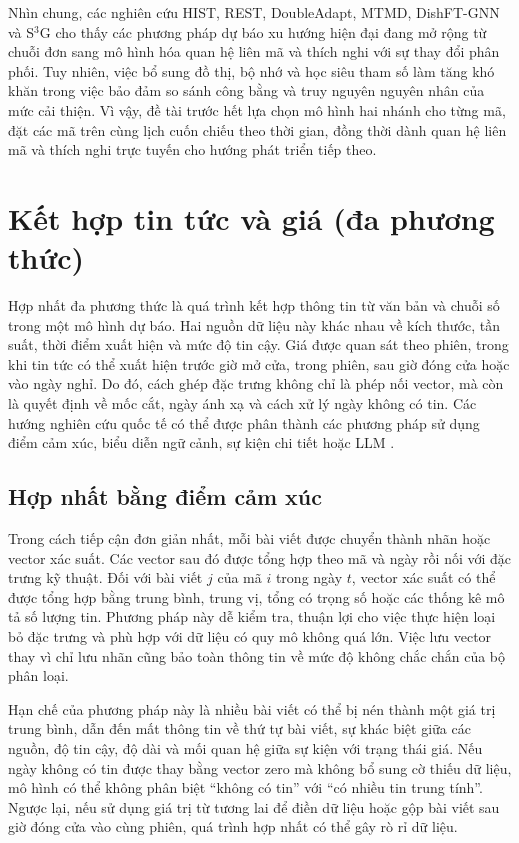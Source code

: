\documentclass[12pt, a4paper, oneside]{report}
\begin{document}
Nhìn chung, các nghiên cứu HIST, REST, DoubleAdapt, MTMD, DishFT-GNN và S$^{3}$G cho thấy các phương pháp dự báo xu hướng hiện đại đang mở rộng từ chuỗi đơn sang mô hình hóa quan hệ liên mã và thích nghi với sự thay đổi phân phối. Tuy nhiên, việc bổ sung đồ thị, bộ nhớ và học siêu tham số làm tăng khó khăn trong việc bảo đảm so sánh công bằng và truy nguyên nguyên nhân của mức cải thiện. Vì vậy, đề tài trước hết lựa chọn mô hình hai nhánh cho từng mã, đặt các mã trên cùng lịch cuốn chiếu theo thời gian, đồng thời dành quan hệ liên mã và thích nghi trực tuyến cho hướng phát triển tiếp theo.
\section{Kết hợp tin tức và giá (đa phương thức)}
\label{sec:tq-fusion}

Hợp nhất đa phương thức là quá trình kết hợp thông tin từ văn bản và chuỗi số trong
một mô hình dự báo. Hai nguồn dữ liệu này khác nhau về kích thước, tần suất, thời điểm
xuất hiện và mức độ tin cậy. Giá được quan sát theo phiên, trong khi tin tức có thể xuất
hiện trước giờ mở cửa, trong phiên, sau giờ đóng cửa hoặc vào ngày nghỉ. Do đó, cách ghép đặc trưng không chỉ là phép nối vector, mà còn là quyết định về mốc cắt, ngày ánh xạ và cách xử lý ngày không có tin. Các hướng nghiên cứu quốc tế có thể được phân thành các phương pháp sử
dụng điểm cảm xúc, biểu diễn ngữ cảnh, sự kiện chi tiết hoặc LLM
\cite{Halder2022_221107392v1,Elahi2024_241101368v1}.

\subsection{Hợp nhất bằng điểm cảm xúc}

Trong cách tiếp cận đơn giản nhất, mỗi bài viết được chuyển thành nhãn hoặc vector xác
suất. Các vector sau đó được tổng hợp theo mã và ngày rồi nối với đặc trưng kỹ thuật.
Đối với bài viết $j$ của mã $i$ trong ngày $t$, vector xác suất có thể được tổng hợp
bằng trung bình, trung vị, tổng có trọng số hoặc các thống kê mô tả số lượng tin. Phương
pháp này dễ kiểm tra, thuận lợi cho việc thực hiện loại bỏ đặc trưng và phù hợp với
dữ liệu có quy mô không quá lớn. Việc lưu vector thay vì chỉ lưu nhãn cũng bảo toàn
thông tin về mức độ không chắc chắn của bộ phân loại.

Hạn chế của phương pháp này là nhiều bài viết có thể bị nén thành một giá trị trung
bình, dẫn đến mất thông tin về thứ tự bài viết, sự khác biệt giữa các nguồn, độ tin cậy,
độ dài và mối quan hệ giữa sự kiện với trạng thái giá. Nếu ngày không có tin được thay
bằng vector zero mà không bổ sung cờ thiếu dữ liệu, mô hình có thể không phân biệt
``không có tin'' với ``có nhiều tin trung tính''. Ngược lại, nếu sử dụng giá trị từ
tương lai để điền dữ liệu hoặc gộp bài viết sau giờ đóng cửa vào cùng phiên, quá trình
hợp nhất có thể gây rò rỉ dữ liệu.
\end{document}
